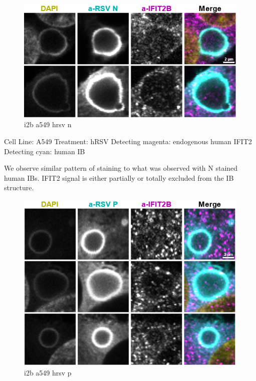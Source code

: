 \begin{figure}
    \centering
    \includegraphics[width=1\linewidth]{10. Chapter 5//Figs//02. I2B/03. i2b a549 hrsv n.png}
    \caption[i2b a549 hrsv n]{i2b a549 hrsv n}
    \label{fig:i2b a549 hrsv n}
\end{figure}

Cell Line: A549 \newline
Treatment: hRSV \newline
Detecting magenta: endogenous human IFIT2  \newline
Detecting cyan: human IB  \newline

We observe similar pattern of staining to what was observed with N stained human IBs. IFIT2 signal is either partially or totally excluded from the IB structure.

\begin{figure}
    \centering
    \includegraphics[width=1\linewidth]{10. Chapter 5//Figs//02. I2B/04. i2b a549 hrsv p.png}
    \caption[i2b a549 hrsv p]{i2b a549 hrsv p}
    \label{fig:i2b a549 hrsv p}
\end{figure}

